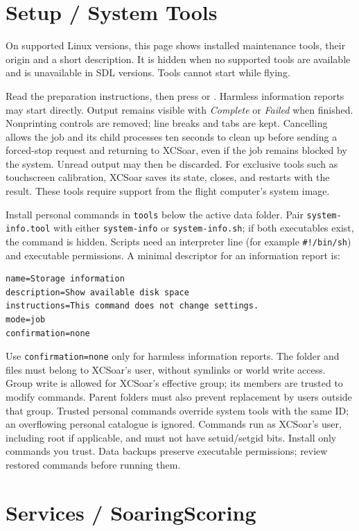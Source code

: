 \section{Setup / System Tools}

On supported Linux versions, this page shows installed maintenance tools,
their origin and a short description.  It is hidden when no supported tools
are available and is unavailable in SDL versions.  Tools cannot start while
flying.

Read the preparation instructions, then press  or
.  Harmless information reports may start directly.
Output remains visible with \emph{Complete} or \emph{Failed} when finished.
Nonprinting controls are removed; line breaks and tabs are kept.
Cancelling allows the job and its child processes ten seconds to clean up
before sending a forced-stop request and returning to XCSoar, even if the
job remains blocked by the system.  Unread output may then be discarded.
For exclusive tools such as touchscreen
calibration, XCSoar saves its state, closes, and restarts with the result.
These tools require support from the flight computer's system image.

Install personal commands in \texttt{tools} below the active data folder.
Pair \texttt{system-info.tool} with either \texttt{system-info} or
\texttt{system-info.sh}; if both executables exist, the command is hidden.
Scripts need an interpreter line (for example \texttt{\#!/bin/sh}) and
executable permissions.  A minimal descriptor for an information report is:
\begin{verbatim}
name=Storage information
description=Show available disk space
instructions=This command does not change settings.
mode=job
confirmation=none
\end{verbatim}
Use \texttt{confirmation=none} only for harmless information reports.
The folder and files must belong to XCSoar's user, without symlinks or world
write access.  Group write is allowed for XCSoar's effective group; its
members are trusted to modify commands.  Parent folders must also prevent
replacement by users outside that group.  Trusted personal commands override
system tools with the same ID; an overflowing personal catalogue is ignored.
Commands run as XCSoar's user, including root if applicable, and must not
have setuid/setgid bits.  Install only commands you trust.  Data backups
preserve executable permissions; review restored commands before running them.


\section{Services / SoaringScoring}


